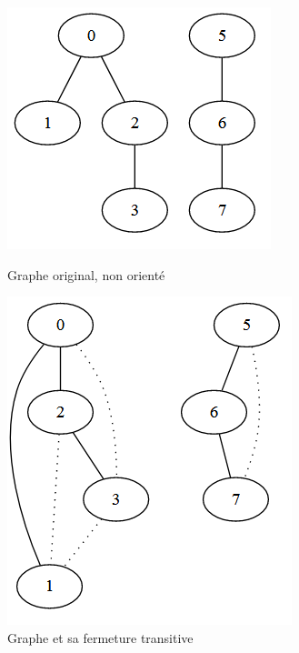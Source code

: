 \documentclass[12pt]{article}
\begin{document}
\begin{figure}[H]
  \centering
  \begin{minipage}[b]{0.4\textwidth}
    \includegraphics[width=\textwidth]{imgs/graph.PNG}
    \caption{Graphe original, non orienté}
  \end{minipage}
  \hfill
  \begin{minipage}[b]{0.4\textwidth}
    \includegraphics[width=\textwidth]{imgs/graphFT.PNG}
    \caption{Graphe et sa fermeture transitive}
  \end{minipage}
\end{figure}
\end{document}

